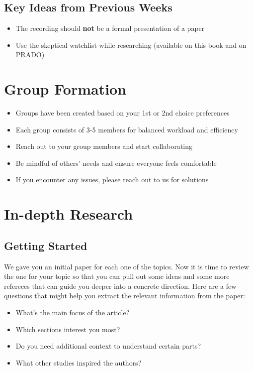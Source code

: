 \documentclass[
  letterpaper,
  DIV=11,
  numbers=noendperiod]{scrreprt}
\providecommand{\tightlist}{%
  \setlength{\itemsep}{0pt}\setlength{\parskip}{0pt}}\usepackage{longtable,booktabs,array}
\begin{document}
\subsection{Key Ideas from Previous
Weeks}\label{key-ideas-from-previous-weeks}

\begin{itemize}
\tightlist
\item
  The recording should \textbf{not} be a formal presentation of a paper
\item
  Use the skeptical watchlist while researching (available on this book
  and on PRADO)
\end{itemize}

\section{Group Formation}\label{group-formation}

\begin{itemize}
\tightlist
\item
  Groups have been created based on your 1st or 2nd choice preferences
\item
  Each group consists of 3-5 members for balanced workload and
  efficiency
\item
  Reach out to your group members and start collaborating
\item
  Be mindful of others' needs and ensure everyone feels comfortable
\item
  If you encounter any issues, please reach out to us for solutions
\end{itemize}

\section{In-depth Research}\label{in-depth-research}

\subsection{Getting Started}\label{getting-started-1}

We gave you an initial paper for each one of the topics. Now it is time
to review the one for your topic so that you can pull out some ideas and
some more refereces that can guide you deeper into a concrete direction.
Here are a few questions that might help you extract the relevant
information from the paper:

\begin{itemize}
\tightlist
\item
  What's the main focus of the article?
\item
  Which sections interest you most?
\item
  Do you need additional context to understand certain parts?
\item
  What other studies inspired the authors?
\end{itemize}
\end{document}
